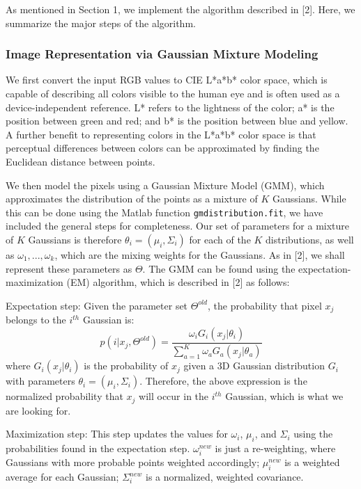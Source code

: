 \documentclass[10pt,twocolumn,letterpaper]{article}
\begin{document}
As mentioned in Section 1, we implement the algorithm described in [2]. Here, we summarize the major steps of the algorithm. 

\subsubsection{Image Representation via Gaussian Mixture Modeling}

We first convert the input RGB values to CIE L*a*b* color space, which is capable of describing all colors visible to the human eye and is often used as a device-independent reference. L* refers to the lightness of the color; a* is the position between green and red; and b* is the position between blue and yellow. A further benefit to representing colors in the L*a*b* color space is that perceptual differences between colors can be approximated by finding the Euclidean distance between points. 

We then model the pixels using a Gaussian Mixture Model (GMM), which approximates the distribution of the points as a mixture of $K$ Gaussians. While this can be done using the Matlab function \texttt{gmdistribution.fit}, we have included the general steps for completeness. Our set of parameters for a mixture of $K$ Gaussians is therefore $\theta_i = (\mu_i, \Sigma_i)$ for each of the $K$ distributions, as well as $\omega_1, ..., \omega_k$, which are the mixing weights for the Gaussians. As in [2], we shall represent these parameters as $\Theta$. The GMM can be found using the expectation-maximization (EM) algorithm, which is described in [2] as follows: 

Expectation step: Given the parameter set $\Theta^{old}$, the probability that pixel $x_j$ belongs to the $i^{th}$ Gaussian is:
\[
  p(i | x_j, \Theta^{old}) = \frac{\omega_i G_i(x_j | \theta_i)}{\sum_{a=1}^K \omega_a G_a(x_j | \theta_a)}
\]
where $G_i(x_j | \theta_i)$ is the probability of $x_j$ given a 3D Gaussian distribution $G_i$ with parameters $\theta_i = (\mu_i, \Sigma_i)$. Therefore, the above expression is the normalized probability that $x_j$ will occur in the $i^{th}$ Gaussian, which is what we are looking for. 

Maximization step: This step updates the values for $\omega_i$, $\mu_i$, and $\Sigma_i$ using the probabilities found in the expectation step. $\omega_i^{new}$ is just a re-weighting, where Gaussians with more probable points weighted accordingly; $\mu_i^{new}$ is a weighted average for each Gaussian; $\Sigma_i^{new}$ is a normalized, weighted covariance. 
\end{document}
